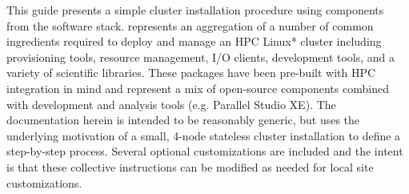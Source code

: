 This guide presents a simple cluster installation procedure using components
from the \OHPC{} software stack. \OHPC{} represents an aggregation of a number
of common ingredients required to deploy and manage an HPC Linux* cluster
including provisioning tools, resource management, I/O clients, development
tools, and a variety of scientific libraries. These packages have been
pre-built with HPC integration in mind and represent a mix of open-source
components combined with \Intel{} development and analysis tools
(e.g. \IntelR{} Parallel Studio XE).  The documentation herein is intended to
be reasonably generic, but uses the underlying motivation of a small, 4-node
stateless cluster installation to define a step-by-step process. Several
optional customizations are included and the intent is that these collective
instructions can be modified as needed for local site customizations.
